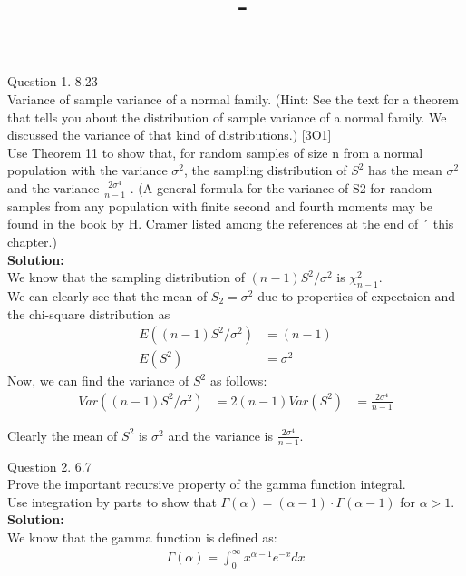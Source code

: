 \documentclass[answers,12pt,addpoints]{exam}
\author{\name}
\title{\course \ - \assignment}
\begin{document}
\maketitle


\newpage
\begin{questions}
    \question Question 1. 8.23\\
    Variance of sample variance of a normal family. (Hint: See the text for a theorem that tells you about the distribution of sample variance of a normal family. We discussed the variance of that kind of distributions.) [3O1]\\
Use Theorem 11 to show that, for random samples of size n from a normal
population with the variance $\sigma^2$, the sampling distribution of $S^2$ has the mean $\sigma^2$
and the variance $\frac{2\sigma^4}{n-1}$ . (A general formula for the variance of S2 for
random samples from any population with finite second and fourth moments may be
found in the book by H\@. Cramer listed among the references at the end of ´
this chapter.)\\
\textbf{Solution:}\\
We know that the sampling distribution of $(n-1)S^2/\sigma^2$ is $\chi^2_{n-1}$.\\
We can clearly see that the mean of $S_2 = \sigma^2$ due to properties of expectaion and the chi-square distribution as
\begin{align*}
    E((n-1)S^2 / \sigma^2) &= (n-1) \\
    E(S^2) &= \sigma^2
\end{align*}
Now, we can find the variance of $S^2$ as follows:
\begin{align*}
    Var((n-1)S^2/ \sigma^2) &= 2(n-1)
    Var(S^2) &= \frac{2\sigma^4}{n-1}
\end{align*}
\begin{solution}
    Clearly the mean of $S^2$ is $\sigma^2$ and the variance is $\frac{2\sigma^4}{n-1}$.
\end{solution}
    \question Question 2. 6.7\\
    Prove the important recursive property of the gamma function integral.\\
Use integration by parts to show that \(\Gamma(\alpha) = (\alpha - 1) \cdot \Gamma(\alpha - 1)\) for \(\alpha > 1\).\\
\textbf{Solution:}\\
We know that the gamma function is defined as:
\begin{align*}
    \Gamma(\alpha) = \int_0^\infty x^{\alpha - 1}e^{-x}dx

\end{align*}
\end{questions}
\end{document}
